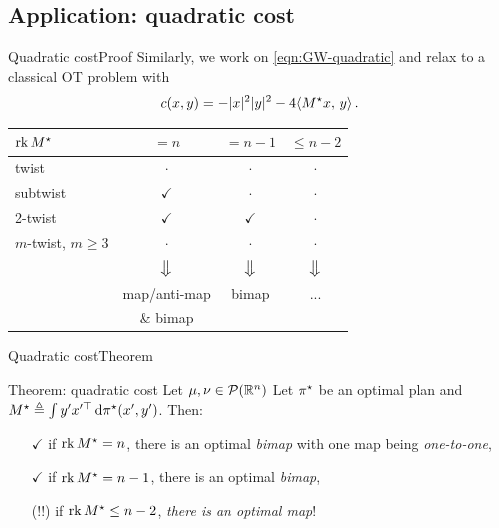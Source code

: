 \documentclass[9pt,xcolor={dvipsnames}]{beamer}
\begin{document}
\subsection{Application: quadratic cost}
\begin{frame}{Quadratic cost}{Proof}
    Similarly, we work on \cref{eqn:GW-quadratic} and relax to a classical OT problem with $$c(x,y)=-|x|^2|y|^2-4\langle M^\star x,\,y\rangle\,.$$
    \begin{table}[h]
        \centering
        \begin{tabular}{lccc}
        $\operatorname*{rk} M^\star$         & $= n$            & $= n-1$    & $\leq n-2$ \\ \hline
        twist               & $\cdot$          & $\cdot$           & $\cdot$           \\
        subtwist            & $\checkmark$     & $\cdot$           &   $\cdot$         \\
        2-twist             & $\checkmark$     & $\checkmark$        &  $\cdot$         \\
        $m$-twist, $m\geq3$ & $\cdot$          & $\cdot$        &  $\cdot$\\\pause
                            & $\big\Downarrow$ & $\big\Downarrow$ &  $\big\Downarrow$\\
                            & map/anti-map     & bimap &  ... \\
                            & \& bimap         &       &
        \end{tabular}
    \end{table}
\end{frame}
\begin{frame}{Quadratic cost}{Theorem}
    \begin{block}{Theorem: quadratic cost}
    Let $\mu, \nu\in \mathcal{P}(\mathbb{R}^n)$  Let $\pi^\star$ be an optimal plan and $M^\star\triangleq\int y' x'^\top \,\mathrm d\pi^\star(x', y')$. Then:
    \begin{itemize}
        \item[$\checkmark$] if $\operatorname*{rk} M^\star=n$, there is an optimal \emph{bimap} with one map being \emph{one-to-one},
        \item[$\checkmark$] if $\operatorname*{rk} M^\star=n-1$, there is an optimal \emph{bimap},
        \item[(!!)] if $\operatorname*{rk} M^\star\leq n-2$, \emph{there is an optimal map}!
    \end{itemize}
    \end{block}
\end{frame}
\end{document}
